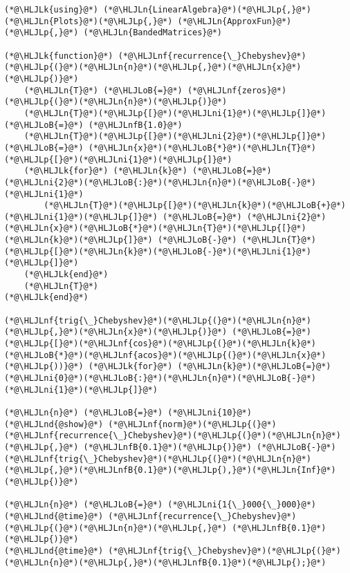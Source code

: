 \documentclass[12pt,landscape]{article}
\newcommand{\HLJLk}[1]{\textcolor[RGB]{148,91,176}{\textbf{#1}}}
\newcommand{\HLJLn}[1]{#1}
\newcommand{\HLJLnd}[1]{\textcolor[RGB]{214,102,97}{#1}}
\newcommand{\HLJLnf}[1]{\textcolor[RGB]{66,102,213}{#1}}
\newcommand{\HLJLnfB}[1]{\textcolor[RGB]{59,151,46}{#1}}
\newcommand{\HLJLni}[1]{\textcolor[RGB]{59,151,46}{#1}}
\newcommand{\HLJLoB}[1]{\textcolor[RGB]{102,102,102}{\textbf{#1}}}
\newcommand{\HLJLp}[1]{#1}
\begin{document}
{\begin{lstlisting}
(*@\HLJLk{using}@*) (*@\HLJLn{LinearAlgebra}@*)(*@\HLJLp{,}@*) (*@\HLJLn{Plots}@*)(*@\HLJLp{,}@*) (*@\HLJLn{ApproxFun}@*)(*@\HLJLp{,}@*) (*@\HLJLn{BandedMatrices}@*)

(*@\HLJLk{function}@*) (*@\HLJLnf{recurrence{\_}Chebyshev}@*)(*@\HLJLp{(}@*)(*@\HLJLn{n}@*)(*@\HLJLp{,}@*)(*@\HLJLn{x}@*)(*@\HLJLp{)}@*)
    (*@\HLJLn{T}@*) (*@\HLJLoB{=}@*) (*@\HLJLnf{zeros}@*)(*@\HLJLp{(}@*)(*@\HLJLn{n}@*)(*@\HLJLp{)}@*)
    (*@\HLJLn{T}@*)(*@\HLJLp{[}@*)(*@\HLJLni{1}@*)(*@\HLJLp{]}@*) (*@\HLJLoB{=}@*) (*@\HLJLnfB{1.0}@*)
    (*@\HLJLn{T}@*)(*@\HLJLp{[}@*)(*@\HLJLni{2}@*)(*@\HLJLp{]}@*) (*@\HLJLoB{=}@*) (*@\HLJLn{x}@*)(*@\HLJLoB{*}@*)(*@\HLJLn{T}@*)(*@\HLJLp{[}@*)(*@\HLJLni{1}@*)(*@\HLJLp{]}@*)
    (*@\HLJLk{for}@*) (*@\HLJLn{k}@*) (*@\HLJLoB{=}@*) (*@\HLJLni{2}@*)(*@\HLJLoB{:}@*)(*@\HLJLn{n}@*)(*@\HLJLoB{-}@*)(*@\HLJLni{1}@*)
        (*@\HLJLn{T}@*)(*@\HLJLp{[}@*)(*@\HLJLn{k}@*)(*@\HLJLoB{+}@*)(*@\HLJLni{1}@*)(*@\HLJLp{]}@*) (*@\HLJLoB{=}@*) (*@\HLJLni{2}@*)(*@\HLJLn{x}@*)(*@\HLJLoB{*}@*)(*@\HLJLn{T}@*)(*@\HLJLp{[}@*)(*@\HLJLn{k}@*)(*@\HLJLp{]}@*) (*@\HLJLoB{-}@*) (*@\HLJLn{T}@*)(*@\HLJLp{[}@*)(*@\HLJLn{k}@*)(*@\HLJLoB{-}@*)(*@\HLJLni{1}@*)(*@\HLJLp{]}@*)
    (*@\HLJLk{end}@*)
    (*@\HLJLn{T}@*)
(*@\HLJLk{end}@*)

(*@\HLJLnf{trig{\_}Chebyshev}@*)(*@\HLJLp{(}@*)(*@\HLJLn{n}@*)(*@\HLJLp{,}@*)(*@\HLJLn{x}@*)(*@\HLJLp{)}@*) (*@\HLJLoB{=}@*) (*@\HLJLp{[}@*)(*@\HLJLnf{cos}@*)(*@\HLJLp{(}@*)(*@\HLJLn{k}@*)(*@\HLJLoB{*}@*)(*@\HLJLnf{acos}@*)(*@\HLJLp{(}@*)(*@\HLJLn{x}@*)(*@\HLJLp{))}@*) (*@\HLJLk{for}@*) (*@\HLJLn{k}@*)(*@\HLJLoB{=}@*)(*@\HLJLni{0}@*)(*@\HLJLoB{:}@*)(*@\HLJLn{n}@*)(*@\HLJLoB{-}@*)(*@\HLJLni{1}@*)(*@\HLJLp{]}@*)

(*@\HLJLn{n}@*) (*@\HLJLoB{=}@*) (*@\HLJLni{10}@*)
(*@\HLJLnd{@show}@*) (*@\HLJLnf{norm}@*)(*@\HLJLp{(}@*)(*@\HLJLnf{recurrence{\_}Chebyshev}@*)(*@\HLJLp{(}@*)(*@\HLJLn{n}@*)(*@\HLJLp{,}@*) (*@\HLJLnfB{0.1}@*)(*@\HLJLp{)}@*) (*@\HLJLoB{-}@*) (*@\HLJLnf{trig{\_}Chebyshev}@*)(*@\HLJLp{(}@*)(*@\HLJLn{n}@*)(*@\HLJLp{,}@*)(*@\HLJLnfB{0.1}@*)(*@\HLJLp{),}@*)(*@\HLJLn{Inf}@*)(*@\HLJLp{)}@*)

(*@\HLJLn{n}@*) (*@\HLJLoB{=}@*) (*@\HLJLni{1{\_}000{\_}000}@*)
(*@\HLJLnd{@time}@*) (*@\HLJLnf{recurrence{\_}Chebyshev}@*)(*@\HLJLp{(}@*)(*@\HLJLn{n}@*)(*@\HLJLp{,}@*) (*@\HLJLnfB{0.1}@*)(*@\HLJLp{)}@*)
(*@\HLJLnd{@time}@*) (*@\HLJLnf{trig{\_}Chebyshev}@*)(*@\HLJLp{(}@*)(*@\HLJLn{n}@*)(*@\HLJLp{,}@*)(*@\HLJLnfB{0.1}@*)(*@\HLJLp{);}@*)
\end{lstlisting}

}
\end{document}
